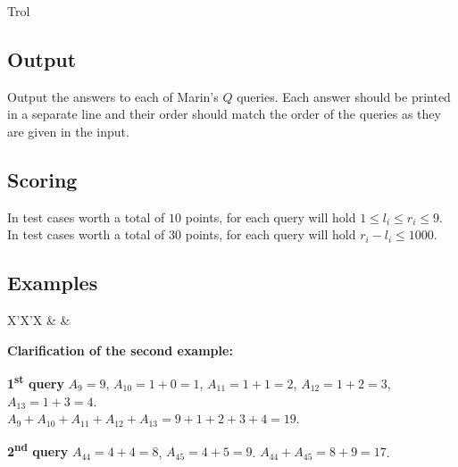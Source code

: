 \begin{statement}[
  problempoints=50,
  timelimit=1 second,
  memorylimit=512 MiB,
]{Trol}
\subsection*{Output}
Output the answers to each of Marin's $Q$ queries. Each answer should be
printed in a separate line and their order should match the order of the
queries as they are given in the input.

\subsection*{Scoring}
In test cases worth a total of $10$ points, for each query will hold
$1 \le l_i \le r_i \le 9$. \\
In test cases worth a total of $30$ points, for each query will hold
$r_i - l_i \le 1000$.

\subsection*{Examples}
\begin{tabularx}{\textwidth}{X'X'X}
 &
 &
\end{tabularx}

\textbf{Clarification of the second example:}

\textbf{1\textsuperscript{st} query} \textrightarrow{}
$A_9 = 9$, $A_{10} = 1 + 0 = 1$, $A_{11} = 1 + 1 = 2$,
$A_{12} = 1 + 2 = 3$, $A_{13} = 1 + 3 = 4$.\\
$A_9 + A_{10} + A_{11} + A_{12} + A_{13} = 9 + 1 + 2 + 3 + 4 = 19$.

\textbf{2\textsuperscript{nd} query} \textrightarrow{}
$A_{44} = 4 + 4 = 8$, $A_{45} = 4 + 5 = 9$. $A_{44} + A_{45} = 8 + 9 = 17$.

\end{statement}

